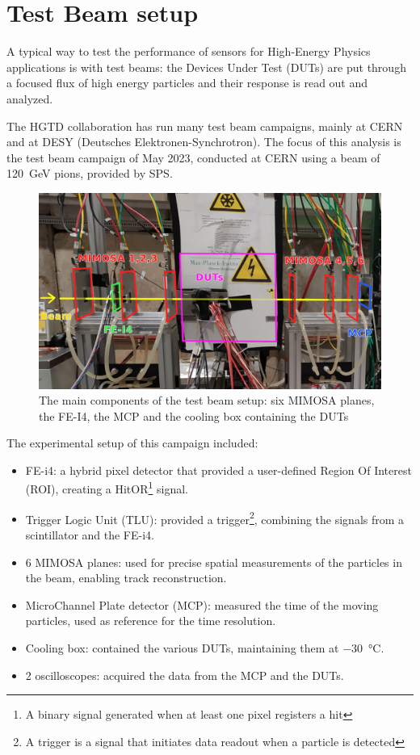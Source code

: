 \chapter{Test Beam setup}\label{chap:testbeam_setup}

A typical way to test the performance of sensors for High-Energy Physics applications is with test beams: the Devices Under Test (DUTs) are put through a focused flux of high energy particles and their response is read out and analyzed. %

The HGTD collaboration has run many test beam campaigns, mainly at CERN and at DESY (Deutsches Elektronen-Synchrotron). The focus of this analysis is the test beam campaign of May 2023, conducted at CERN using a beam of \qty{120}{\giga\electronvolt} pions, provided by SPS.

\begin{figure}[h!tbp]
    \centering
    \includegraphics[width=.95\linewidth]{Images/TestBeam_setup/TestBeam_setup_redrawn.png}
    \captionsetup{width=\captionwidth}
    \caption{The main components of the test beam setup: six MIMOSA planes, the FE-I4, the MCP and the cooling box containing the DUTs}
    \label{fig:testbeam_setup}
\end{figure}

The experimental setup of this campaign included:
\begin{itemize}
    \item FE-i4: a hybrid pixel detector that provided a user-defined Region Of Interest (ROI), creating a HitOR\footnote{A binary signal generated when at least one pixel registers a hit} signal. %
    \item Trigger Logic Unit (TLU): provided a trigger\footnote{A trigger is a signal that initiates data readout when a particle is detected}, combining the signals from a scintillator and the FE-i4. %
    \item 6 MIMOSA planes: used for precise spatial measurements of the particles in the beam, enabling track reconstruction.
    \item MicroChannel Plate detector (MCP): measured the time of the moving particles, used as reference for the time resolution.
    \item Cooling box: contained the various DUTs, maintaining them at \qty{-30}{\degreeCelsius}.
    \item 2 oscilloscopes: acquired the data from the MCP and the DUTs. %
\end{itemize}

